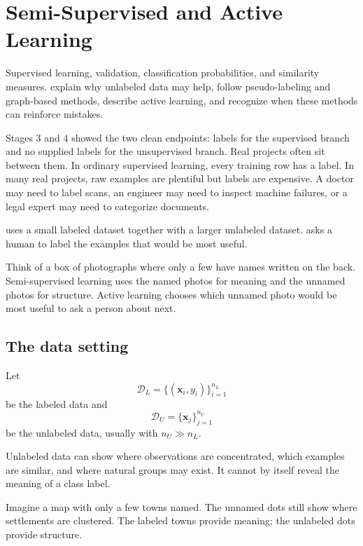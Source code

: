 \chapter{Semi-Supervised and Active Learning}
\label{ch:semi-supervised}

\chapterguide%
  {Supervised learning, validation, classification probabilities, and similarity measures.}
  {explain why unlabeled data may help, follow pseudo-labeling and graph-based methods, describe active learning, and recognize when these methods can reinforce mistakes.}

Stages 3 and 4 showed the two clean endpoints: labels for the supervised branch and no supplied labels for the unsupervised branch. Real projects often sit between them. In ordinary supervised learning, every training row has a label. In many real projects, raw examples are plentiful but labels are expensive. A doctor may need to label scans, an engineer may need to inspect machine failures, or a legal expert may need to categorize documents.

 uses a small labeled dataset together with a larger unlabeled dataset.  asks a human to label the examples that would be most useful.

\begin{firstread}
Think of a box of photographs where only a few have names written on the back. Semi-supervised learning uses the named photos for meaning and the unnamed photos for structure. Active learning chooses which unnamed photo would be most useful to ask a person about next.
\end{firstread}

\section{The data setting}

Let
\[
  \mathcal{D}_L=\{(\bm{x}_i,y_i)\}_{i=1}^{n_L}
\]
be the labeled data and
\[
  \mathcal{D}_U=\{\bm{x}_j\}_{j=1}^{n_U}
\]
be the unlabeled data, usually with $n_U\gg n_L$.

Unlabeled data can show where observations are concentrated, which examples are similar, and where natural groups may exist. It cannot by itself reveal the meaning of a class label.

\begin{intuition}
Imagine a map with only a few towns named. The unnamed dots still show where settlements are clustered. The labeled towns provide meaning; the unlabeled dots provide structure.
\end{intuition}

